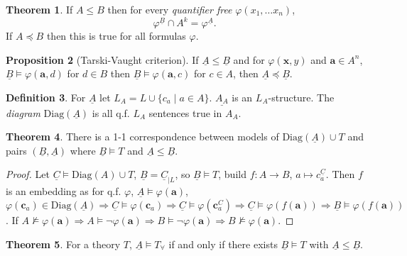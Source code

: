 \documentclass[a4paper,10pt]{article}
\theoremstyle{definition}
\newtheorem{theorem}{Theorem}
\newtheorem{definition}[theorem]{Definition}
\newtheorem{proposition}[theorem]{Proposition}
\let\vec\mathbf
\let\phi\varphi
\let\preceq\preccurlyeq
\let\leq\leqslant
\let\implies\Rightarrow
\begin{document}
\begin{theorem}
    If $A \leqslant B$ then for every \emph{quantifier free} $\varphi(x_1, \ldots x_n)$, 
    \[\varphi ^ {\underline{B}} \cap A^k = \varphi ^ {\underline{A}}.\]
    If $A \preceq B$ then this is true for all formulas $\varphi$.
\end{theorem}

\begin{proposition}[Tarski-Vaught criterion]
    If $\underline{A} \leqslant \underline{B}$ and for $\phi(\vec{x}, y )$ and $\vec{a} \in A^n$, $\underline{B} \models \phi(\vec{a}, d)$ for $d \in B$ then $\underline{B} \models \phi(\vec{a}, c)$ for $c \in A$, then $\underline{A} \preceq \underline{B}$.
\end{proposition}

\begin{definition}
    For $\underline{A}$ let $L_A = L \cup \{c_a \mid a \in A\}$. $\underline{A_A}$ is an $L_A$-structure. The \emph{diagram} $\mathrm{Diag}(\underline{A})$ is all q.f. $L_A$ sentences true in $A_A$.
\end{definition}

\begin{theorem}
    There is a 1-1 correspondence between models of $\mathrm{Diag}(\underline{A}) \cup T$ and pairs $(\underline{B}, \underline{A})$ where $\underline{B} \models T$ and $\underline{A} \leq \underline{B}$.
\end{theorem}

\begin{proof}
    Let $\underline{C} \models \mathrm{Diag}(A) \cup T$, $\underline{B} = \underline{C}_{\mid L}$, so $\underline{B} \models T$, build $f \colon A \rightarrow B$, $a \mapsto c_a^{\underline{C}}$. Then $f$ is an embedding as for q.f. $\phi$, $\underline{A} \models \phi(\vec{a})$, $\phi(\vec{c}_a) \in \mathrm{Diag}(\underline{A}) \implies \underline{C} \models  \phi(\vec{c}_a) \implies \underline{C} \models \phi(\vec{c}_a^C) \implies \underline{C} \models \phi(f(\vec{a})) \implies \underline{B} \models \phi(f(\vec{a}))$. If $A \nvDash \phi(\vec{a}) \implies A \models \neg \phi(\vec{a}) \implies B \models \neg \phi(\vec{a}) \implies B \nvDash \phi(\vec{a})$.
\end{proof}



\begin{theorem}
    For a theory $T$, $\underline{A} \models T_{\forall}$ if and only if there exists $\underline{B} \models T$ with $\underline{A}  \leqslant \underline{B}$. 
\end{theorem}
\end{document}
